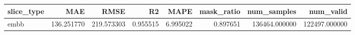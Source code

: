 \begin{tabular}{lrrrrrrr}
\toprule
slice_type & MAE & RMSE & R2 & MAPE & mask_ratio & num_samples & num_valid \\
\midrule
embb & 136.251770 & 219.573303 & 0.955515 & 6.995022 & 0.897651 & 136464.000000 & 122497.000000 \\
\bottomrule
\end{tabular}
